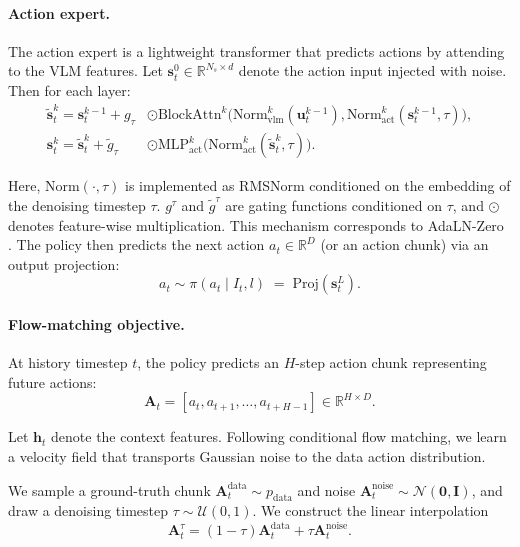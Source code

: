 \paragraph{Action expert.}
The action expert is a lightweight transformer that predicts actions by attending to the VLM features.
Let $\mathbf{s}_t^{0} \in \mathbb{R}^{N_s \times d}$ denote the action input injected with noise. Then for each layer:
\begin{align}
\tilde{\mathbf{s}}_t^{k} =
\mathbf{s}_t^{k-1} +
g_{\tau} &\odot
\mathrm{BlockAttn}^{k}\!\big(
\mathrm{Norm}_\text{vlm}^{k}(\mathbf{u}_t^{k-1}),
\mathrm{Norm}_\text{act}^{k}(\mathbf{s}_t^{k-1}, \tau)
\big),
\label{eq:act_attn}\\
\mathbf{s}_t^{k} =
\tilde{\mathbf{s}}_t^{k} +
\tilde{g}_{\tau} &\odot
\mathrm{MLP}_{\text{act}}^{k}\!\big(
\mathrm{Norm}_\text{act}^{k}(\tilde{\mathbf{s}}_t^{k}, \tau)
\big).
\label{eq:act_mlp}
\end{align}

Here, $\mathrm{Norm}(\cdot, \tau)$ is implemented as RMSNorm conditioned on the embedding of the denoising timestep $\tau$.
$g^\tau$ and $\tilde{g}^\tau$ are gating functions conditioned on $\tau$, and $\odot$ denotes feature-wise multiplication.
This mechanism corresponds to AdaLN-Zero \cite{peebles2023scalable}.
The policy then predicts the next action $a_t \in \mathbb{R}^{D}$ (or an action chunk) via an output projection:
\begin{equation}
a_t \sim \pi(a_t \mid I_t, l) \;=\; \mathrm{Proj}(\mathbf{s}_t^{L}).
\end{equation}

\paragraph{Flow-matching objective.}

At history timestep $t$, the policy predicts an $H$-step action chunk representing future actions:
\begin{equation}
\mathbf{A}_t = [a_t, a_{t+1}, \dots, a_{t+H-1}] \in \mathbb{R}^{H \times D}.
\end{equation}

Let $\mathbf{h}_t$ denote the context features. 
Following conditional flow matching, we learn a velocity field that transports Gaussian noise to the data action distribution.

We sample a ground-truth chunk
$\mathbf{A}_t^{\text{data}} \sim p_{\text{data}}$
and noise
$\mathbf{A}_t^{\text{noise}} \sim \mathcal{N}(\mathbf{0}, \mathbf{I})$,
and draw a denoising timestep $\tau \sim \mathcal{U}(0,1)$.
We construct the linear interpolation
\begin{equation}
\mathbf{A}_t^\tau
=
(1-\tau)\mathbf{A}_t^{\text{data}}
+
\tau \mathbf{A}_t^{\text{noise}} .
\end{equation}


